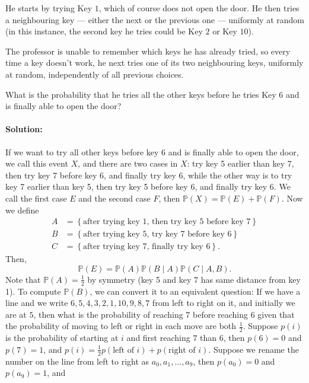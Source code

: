 \documentclass[a4paper,12pt]{article}
\begin{document}
He starts by trying Key $1$, which of course does not open the door. He then tries a neighbouring key --- either the next or the previous one --- uniformly at random (in this instance, the second key he tries could be Key $2$ or Key $10$).

The professor is unable to remember which keys he has already tried, so every time a key doesn't work, he next tries one of its two neighbouring keys, uniformly at random, independently of all previous choices.

What is the probability that he tries all the other keys before he tries Key $6$ and is finally able to open the door?

\paragraph{Solution:} If we want to try all other keys before key 6 and is finally able to open the door, we call this event \(X\), and there are two cases in \(X\): try key 5 earlier than key 7, then try key 7 before key 6, and finally try key 6, while the other way is to try key 7 earlier than key 5, then try key 5 before key 6, and finally try key 6. We call the first case \(E\) and the second case \(F\), then \(\mathbb{P} (X) = \mathbb{P} (E) + \mathbb{P} (F)\). Now we define 
\begin{align*}
	A &= \left\{ \text{after trying key 1, then try key 5 before key 7}  \right\} \\
	B &= \left\{ \text{after trying key 5, try key 7 before key 6}  \right\} \\
	C &= \left\{ \text{after trying key 7, finally try key 6}  \right\}.    
\end{align*} 
Then,
\[
	\mathbb{P} (E) = \mathbb{P} (A) \mathbb{P} (B \mid A) \mathbb{P} (C \mid A, B).
\] 
Note that \(\mathbb{P} (A) = \frac{1}{2}\) by symmetry (key 5 and key 7 has same distance from key 1). To compute \(\mathbb{P} (B)\), we can convert it to an equivalent question: If we have a line and we write \(6, 5, 4, 3, 2, 1, 10, 9, 8, 7\) from left to right on it, and initially we are at \(5\), then what is the probability of reaching 7 before reaching 6 given that the probability of moving to left or right in each move are both \(\frac{1}{2}\). Suppose \(p(i)\) is the probability of starting at \(i\) and first reaching \(7\) than \(6\), then \(p(6) = 0\) and \(p(7) = 1\), and \(p(i) = \frac{1}{2} p(\text{left of } i) + p(\text{right of } i)\). Suppose we rename the number on the line from left to right as \(a_0, a_1, \dots , a_{9}\), then \(p(a_0) = 0\) and \(p(a_{9}) = 1\), and 
\end{document}
